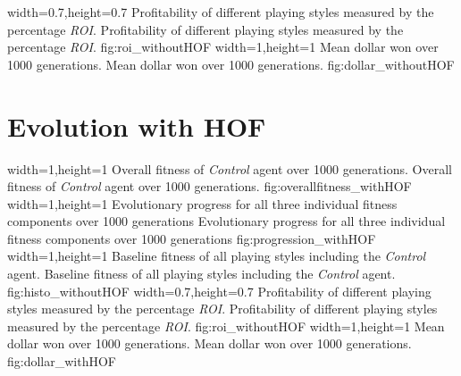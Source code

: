   {width=0.7\textwidth,height=0.7\textheight}%
  {Profitability of different playing styles measured by the percentage \textit{ROI}.}%
  {Profitability of different playing styles measured by the percentage \textit{ROI}.}%
  {fig:roi_withoutHOF}%
  {width=1\textwidth,height=1\textheight}%
  {Mean dollar won over 1000 generations.}%
  {Mean dollar won over 1000 generations.}%
  {fig:dollar_withoutHOF}%
  \pagebreak
\section{Evolution with HOF}
  {width=1\textwidth,height=1\textheight}%
  {Overall fitness of \textit{Control} agent over 1000 generations.}%
  {Overall fitness of \textit{Control} agent over 1000 generations.}%
  {fig:overallfitness_withHOF}%
  {width=1\textwidth,height=1\textheight}%
  {Evolutionary progress for all three individual fitness components over 1000 generations}%
  {Evolutionary progress for all three individual fitness components over 1000 generations}%
  {fig:progression_withHOF}%
  {width=1\textwidth,height=1\textheight}%
  {Baseline fitness of all playing styles including the \textit{Control} agent.}%
  {Baseline fitness of all playing styles including the \textit{Control} agent.}%
  {fig:histo_withoutHOF}%
  {width=0.7\textwidth,height=0.7\textheight}%
  {Profitability of different playing styles measured by the percentage \textit{ROI}.}%
  {Profitability of different playing styles measured by the percentage \textit{ROI}.}%
  {fig:roi_withoutHOF}%
  {width=1\textwidth,height=1\textheight}%
  {Mean dollar won over 1000 generations.}%
  {Mean dollar won over 1000 generations.}%
  {fig:dollar_withHOF}%

